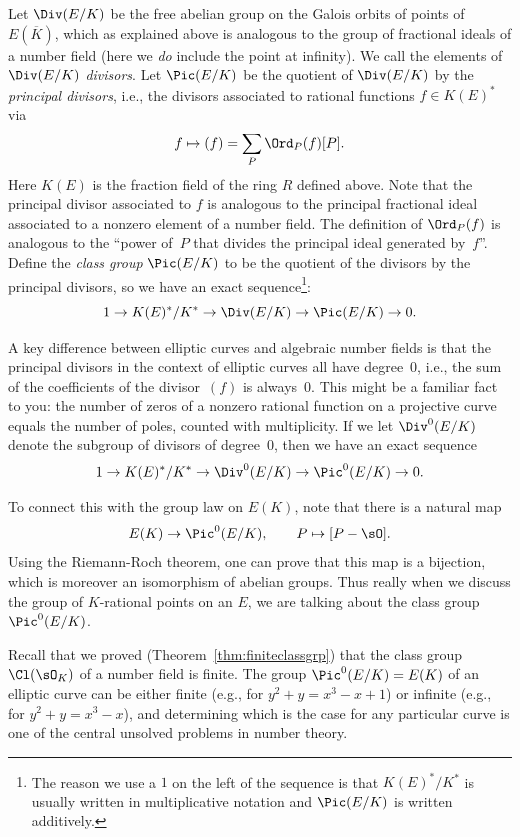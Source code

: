 Let $\Div(E/K)$ be the free abelian group on the Galois orbits of
points of~$E(\overline{K})$, which as explained above is analogous to
the group of fractional ideals of a number field (here we {\em do}
include the point at infinity).
We call the elements of $\Div(E/K)$
{\em divisors}.  Let $\Pic(E/K)$ be the quotient of $\Div(E/K)$ by the
\emph{principal divisors}, i.e., the divisors associated to rational functions
$f\in K(E)^*$ via
\[
  f \mapsto (f) = \sum_{P} \Ord_P(f) [P].
\]
Here $K(E)$ is the fraction field of the ring $R$ defined above.
Note that the principal divisor associated to $f$ is analogous to the
principal fractional ideal associated to a nonzero element of a number
field.  The definition of $\Ord_P(f)$ is analogous to the ``power
of~$P$ that divides the principal ideal generated by~$f$''.
Define the \emph{class group} $\Pic(E/K)$ to be the quotient of the
divisors by the principal divisors, so we have
an exact sequence\footnote{
  The reason we use a $1$ on the left of the sequence is that
  $K(E)^*/K^*$ is usually written in multiplicative notation
  and $\Pic(E/K)$ is written additively.
}:
\[
  1 \to K(E)^*/K^* \to \Div(E/K) \to \Pic(E/K) \to 0.
\]

A key difference between elliptic curves and algebraic number fields
is that the principal divisors in the context of elliptic curves all
have degree~$0$, i.e., the sum of the coefficients of the
divisor~$(f)$ is always~$0$.  This might be a familiar fact to you:
the number of zeros of a nonzero rational function on a projective
curve equals the number of poles, counted with multiplicity.  If we
let $\Div^0(E/K)$ denote the subgroup of divisors of degree~$0$, then
we have an exact sequence
\[
  1\to K(E)^*/K^* \to \Div^0(E/K) \to \Pic^0(E/K) \to 0.
\]

To connect this with the group law on $E(K)$, note that there
is a natural map
\[
  E(K) \to \Pic^0(E/K), \qquad P \mapsto [P-\sO].
\]
Using the Riemann-Roch theorem, one can prove that this map
is a bijection, which is moreover an isomorphism of abelian groups.
Thus really when we discuss the group of $K$-rational
points on an $E$, we are talking
about the class group $\Pic^0(E/K)$.

Recall that we proved (Theorem~\ref{thm:finiteclassgrp}) that the
class group $\Cl(\sO_K)$ of a number field is finite.
The  group $\Pic^0(E/K) =E(K)$ of an elliptic curve can be
either finite (e.g., for $y^2 + y = x^3 - x + 1$) or infinite (e.g.,
for $y^2 + y = x^3 - x$), and determining which is the case for any particular
curve is one of the central unsolved problems in number theory.

